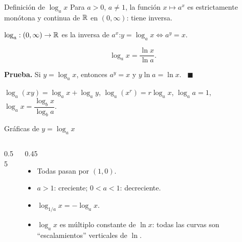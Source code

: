 \documentclass[10pt,aspectratio=169]{beamer}
\begin{document}
\begin{frame}{Definición de $\log_ax$}
  Para $a>0$, $a\ne1$, la función $x\mapsto a^x$ es estrictamente monótona y continua de $\mathbb{R}$ en $(0,\infty)$:
  tiene inversa.
  \begin{definicion}
    $\log_a:(0,\infty)\to\mathbb{R}$ es la inversa de $a^x$:\qquad $y=\log_ax\iff a^y=x$.
  \end{definicion}
  \begin{teorema}
    \[ \log_ax=\frac{\ln x}{\ln a}. \]
  \end{teorema}
  \textbf{Prueba.} Si $y=\log_ax$, entonces $a^y=x$ y $y\ln a=\ln x$. \ $\blacksquare$
  \begin{proposicion}
    $\log_a(xy)=\log_ax+\log_ay$, \quad $\log_a(x^r)=r\log_ax$, \quad $\log_a a=1$, \quad
    $\log_a x=\dfrac{\log_bx}{\log_ba}$.
  \end{proposicion}
\end{frame}

\begin{frame}{Gráficas de $y=\log_ax$}
  \begin{columns}
    \begin{column}{0.55\textwidth}
      \centering
    \end{column}
    \begin{column}{0.45\textwidth}
      \begin{itemize}
        \item Todas pasan por $(1,0)$.
        \item $a>1$: creciente; $0<a<1$: decreciente.
        \item $\log_{1/a}x=-\log_ax$.
        \item $\log_ax$ es múltiplo constante de $\ln x$: todas las curvas son ``escalamientos'' verticales de $\ln$.
      \end{itemize}
    \end{column}
  \end{columns}
\end{frame}
\end{document}
